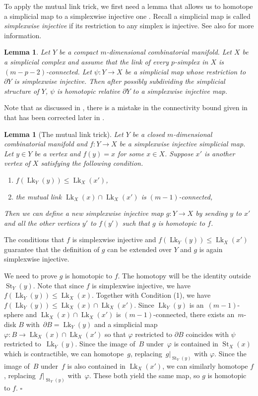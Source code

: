 \documentclass[11pt, a4paper]{amsart}
\newtheorem{lem}[thm]{Lemma}
\theoremstyle{definition}
\DeclareMathOperator{\Lk}{Lk}
\DeclareMathOperator{\St}{St}
\def\Proof{\noindent{\bf Proof.}\quad}
\def\qed{\hfill$\square$\smallskip}
\begin{document}
To apply the  mutual link trick, we first need a lemma that allows us to homotope a simplicial map to a simplexwise injective one \cite[Lemma 3.9]{BFM+16}.  Recall a simplicial map is called \emph{simplexwise injective} if its
restriction to any simplex is injective. See also \cite[Section 2.1]{GRW18} for more information.


\begin{lem}
\label{lem:injectifying}
Let $Y$ be a compact $m$-dimensional combinatorial manifold.  Let $X$ be a
simplicial complex and assume that the link of every $p$-simplex in
$X$ is $(m-p-2)$-connected.  Let $\psi \colon Y \to X$ be a
simplicial map whose restriction to $\partial Y$ is simplexwise
injective.  Then after possibly subdividing the simplicial structure of $Y$, $\psi$ is
homotopic relative $\partial Y$ to a simplexwise injective map.
\end{lem}


Note that as discussed in \cite[Lemma 5.19]{GLU20}, there is a mistake in the connectivity bound given in \cite{BFM+16} that has been corrected later in \cite{BWZ21}. 

\begin{lem}[The mutual link trick]\label{lemma-replace-trick}
Let $Y$ be a closed $m$-dimensional combinatorial manifold and $f: Y\to X$ be a simplexwise injective simplicial map. Let $y \in Y$ be a vertex and $f(y) = x$ for some $x\in X$. Suppose $x'$ is another vertex of $X$ satisfying the following condition.
\begin{enumerate}
    \item $f(\Lk_{Y}(y)) \leq \Lk_{X} (x')$,
    \item the mutual link $\Lk_{X} (x) \cap \Lk_{X}(x')$ is $(m-1)$-connected,
\end{enumerate}
Then we can define a new simplexwise injective map $g:Y\to X $ by sending $y$ to $x'$ and all the other vertices $y'$ to $f(y')$ such that $g$ is homotopic to $f$. 
\end{lem}
\Proof 
The conditions that $f$ is simplexwise injective and $f(\Lk_{Y}(y)) \leq \Lk_{X} (x')$ guarantee that the definition of $g$ can be extended over $Y$ and $g$ is again simplexwise injective. 

We need to prove $g$ is homotopic to $f$. The homotopy will be the identity outside $\St_{Y}(y)$. Note that since $f$ is simplexwise injective, we have $f(\Lk_Y(y))\leq \Lk_X(x)$. Together with Condition (1), we have $f(\Lk_Y(y))\leq \Lk_X(x)\cap \Lk_{X} (x')$. Since
$\Lk_{Y}(y)$ is an~$(m-1)$-sphere and $\Lk_{X} (x) \cap \Lk_{X}(x')$ is $(m-1)$-connected,  there exists
an~$m$-disk $B$ with~$\partial B=\Lk_{Y}(y)$ and a simplicial
map~$\varphi\colon B \to \Lk_X(x)\cap\Lk_X(x')$ so that $\varphi$
restricted to $\partial B$ coincides with $\psi$ restricted
to~$\Lk_{Y}(y)$.  Since the image of~$B$ under~$\varphi$ is
contained in $\St_X(x)$ which is contractible, we can homotope~$g$,
replacing~$g|_{\St_{Y}(y)}$ with $\varphi$.  Since the image
of~$B$ under~$f$ is also contained in $\Lk_X(x')$, we can
similarly homotope $f$, replacing~$f|_{\St_{Y}(y)}$
with~$\varphi$.  These both yield the same map, so  $g$ is homotopic to $f$.  \qed
\end{document}
